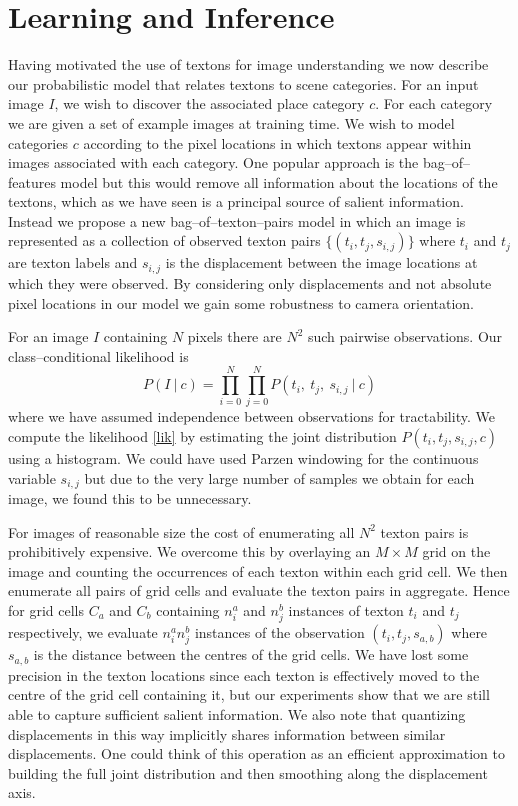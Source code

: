 \section{Learning and Inference}
\label{sec:approach}
Having motivated the use of textons for image understanding we now
describe our probabilistic model that relates textons to scene
categories. For an input image $I$, we wish to discover the associated
place category $c$. For each category we are given a set of example
images at training time. We wish to model categories $c$ according
to the pixel locations in which textons appear within images
associated with each category. One popular approach is the
bag--of--features model \cite{Jebara03} but this would remove all
information about the locations of the textons, which as we have seen
is a principal source of salient information. Instead we propose a new
bag--of--texton--pairs model in which an image is represented as a
collection of observed texton pairs $\{(t_i, t_j, s_{i,j})\}$ where
$t_i$ and $t_j$ are texton labels and $s_{i,j}$ is the displacement
between the image locations at which they were observed. By
considering only displacements and not absolute pixel locations in our
model we gain some robustness to camera orientation.

For an image $I$ containing $N$ pixels there are $N^2$ such
pairwise observations. Our class--conditional likelihood is
\begin{equation}
P(I ~|~ c) = \prod_{i=0}^N \prod_{j=0}^N
P(t_i, ~ t_j, ~ s_{i,j} ~|~ c) \label{lik}
\end{equation}
where we have assumed independence between observations for
tractability. We compute the likelihood \eqref{lik} by estimating the
joint distribution $P(t_i,t_j,s_{i,j},c)$ using a histogram. We could
have used Parzen windowing \cite{Parzen62} for the continuous variable
$s_{i,j}$ but due to the very large number of samples we obtain for
each image, we found this to be unnecessary.

For images of reasonable size the cost of enumerating all $N^2$ texton
pairs is prohibitively expensive. We overcome this by overlaying an $M
\times M$ grid on the image and counting the occurrences of each
texton within each grid cell. We then enumerate all pairs of grid
cells and evaluate the texton pairs in aggregate. Hence for grid cells
$C_a$ and $C_b$ containing $n^a_i$ and $n^b_j$ instances of texton
$t_i$ and $t_j$ respectively, we evaluate $n^a_i n^b_j$ instances of
the observation $(t_i,t_j,s_{a,b})$ where $s_{a,b}$ is the distance
between the centres of the grid cells. We have lost some precision in
the texton locations since each texton is effectively moved to the
centre of the grid cell containing it, but our experiments show that
we are still able to capture sufficient salient information. We also
note that quantizing displacements in this way implicitly shares
information between similar displacements. One could think of this
operation as an efficient approximation to building the full joint
distribution and then smoothing along the displacement
axis.\changedsinceviva

